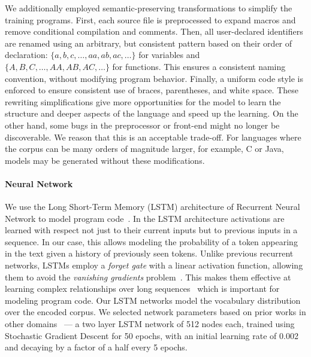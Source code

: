 We additionally employed semantic-preserving transformations to simplify the training programs. First, each source file is preprocessed to expand macros and remove conditional compilation and comments. Then, all user-declared identifiers are renamed using an arbitrary, but consistent pattern based on their order of declaration: $\{a,\allowbreak b,\allowbreak c,\allowbreak \ldots,\allowbreak aa,\allowbreak ab,\allowbreak ac,\allowbreak \ldots\}$ for variables and $\{A,\allowbreak B,\allowbreak C,\allowbreak \ldots,\allowbreak AA,\allowbreak AB,\allowbreak AC,\allowbreak \ldots\}$ for functions. This ensures a consistent naming convention, without modifying program behavior. Finally, a uniform code style is enforced to ensure consistent use of braces, parentheses, and white space. These rewriting simplifications give more opportunities for the model to learn the structure and deeper aspects of the language and speed up the learning. On the other hand, some bugs in the preprocessor or front-end might no longer be discoverable. We reason that this is an acceptable trade-off. For languages where the corpus can be many orders of magnitude larger, for example, C or Java, models may be generated without these modifications.

\paragraph{Neural Network} We use the Long Short-Term Memory (LSTM) architecture of Recurrent Neural Network to model program code~\cite{Hochreiter1997}. In the LSTM architecture activations are learned with respect not just to their current inputs but to previous inputs in a sequence. In our case, this allows modeling the probability of a token appearing in the text given a history of previously seen tokens. Unlike previous recurrent networks, LSTMs employ a \emph{forget gate} with a linear activation function, allowing them to avoid the \emph{vanishing gradients} problem~\cite{Pacanu2013}. This makes them effective at learning complex relationships over long sequences~\cite{Lipton2015} which is important for modeling program code. Our LSTM networks model the vocabulary distribution over the encoded corpus. We selected network parameters based on prior works in other domains~\cite{Vinyals,Karpathy2016,Jozefowicz2016a} --- a two layer LSTM network of 512 nodes each, trained using Stochastic Gradient Descent for 50 epochs, with an initial learning rate of 0.002 and decaying by a factor of a half every 5 epochs.

